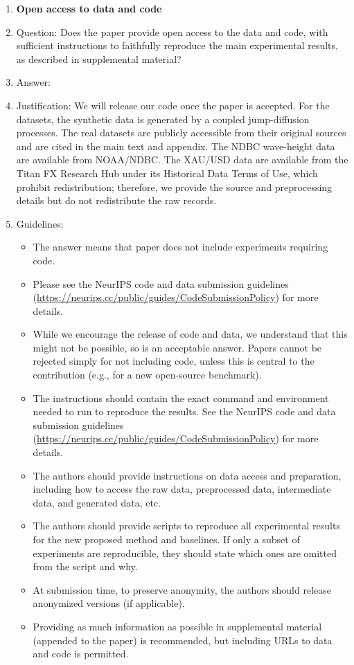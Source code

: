 \documentclass{article}
\begin{document}
\begin{enumerate}
\item {\bf Open access to data and code}
    \item[] Question: Does the paper provide open access to the data and code, with sufficient instructions to faithfully reproduce the main experimental results, as described in supplemental material?
    \item[] Answer: \answerYes{} %
        \item[] Justification: We will release our code once the paper is accepted. For the datasets, the synthetic data is generated by a coupled jump-diffusion processes. The real datasets are publicly accessible from their original sources and are cited in the main text and appendix. The NDBC wave-height data are available from NOAA/NDBC. The XAU/USD data are available from the Titan FX Research Hub under its Historical Data Terms of Use, which prohibit redistribution; therefore, we provide the source and preprocessing details but do not redistribute the raw records.
    \item[] Guidelines:
    \begin{itemize}
        \item The answer \answerNA{} means that paper does not include experiments requiring code.
        \item Please see the NeurIPS code and data submission guidelines (\url{https://neurips.cc/public/guides/CodeSubmissionPolicy}) for more details.
        \item While we encourage the release of code and data, we understand that this might not be possible, so \answerNo{} is an acceptable answer. Papers cannot be rejected simply for not including code, unless this is central to the contribution (e.g., for a new open-source benchmark).
        \item The instructions should contain the exact command and environment needed to run to reproduce the results. See the NeurIPS code and data submission guidelines (\url{https://neurips.cc/public/guides/CodeSubmissionPolicy}) for more details.
        \item The authors should provide instructions on data access and preparation, including how to access the raw data, preprocessed data, intermediate data, and generated data, etc.
        \item The authors should provide scripts to reproduce all experimental results for the new proposed method and baselines. If only a subset of experiments are reproducible, they should state which ones are omitted from the script and why.
        \item At submission time, to preserve anonymity, the authors should release anonymized versions (if applicable).
        \item Providing as much information as possible in supplemental material (appended to the paper) is recommended, but including URLs to data and code is permitted.
    \end{itemize}



\end{enumerate}
\end{document}
